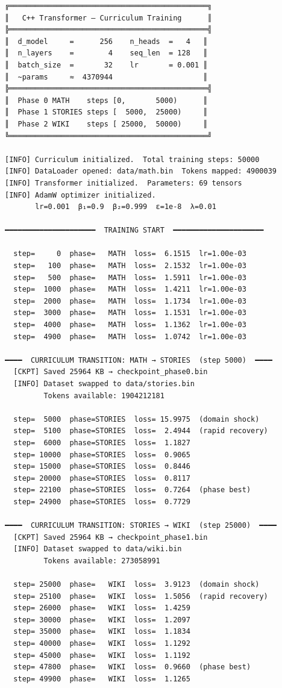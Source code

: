 \documentclass[12pt, a4paper]{article}
\begin{document}
\begin{verbatim}
╔══════════════════════════════════════════════╗
║   C++ Transformer — Curriculum Training      ║
╠══════════════════════════════════════════════╣
║  d_model     =      256    n_heads  =   4   ║
║  n_layers    =        4    seq_len  = 128   ║
║  batch_size  =       32    lr       = 0.001 ║
║  ~params     ≈  4370944                     ║
╠══════════════════════════════════════════════╣
║  Phase 0 MATH    steps [0,       5000)      ║
║  Phase 1 STORIES steps [  5000,  25000)     ║
║  Phase 2 WIKI    steps [ 25000,  50000)     ║
╚══════════════════════════════════════════════╝

[INFO] Curriculum initialized.  Total training steps: 50000
[INFO] DataLoader opened: data/math.bin  Tokens mapped: 4900039
[INFO] Transformer initialized.  Parameters: 69 tensors
[INFO] AdamW optimizer initialized.
       lr=0.001  β₁=0.9  β₂=0.999  ε=1e-8  λ=0.01

━━━━━━━━━━━━━━━━━━━━━  TRAINING START  ━━━━━━━━━━━━━━━━━━━━━

  step=     0  phase=   MATH  loss=  6.1515  lr=1.00e-03
  step=   100  phase=   MATH  loss=  2.1532  lr=1.00e-03
  step=   500  phase=   MATH  loss=  1.5911  lr=1.00e-03
  step=  1000  phase=   MATH  loss=  1.4211  lr=1.00e-03
  step=  2000  phase=   MATH  loss=  1.1734  lr=1.00e-03
  step=  3000  phase=   MATH  loss=  1.1531  lr=1.00e-03
  step=  4000  phase=   MATH  loss=  1.1362  lr=1.00e-03
  step=  4900  phase=   MATH  loss=  1.0742  lr=1.00e-03

━━━━  CURRICULUM TRANSITION: MATH → STORIES  (step 5000)  ━━━━
  [CKPT] Saved 25964 KB → checkpoint_phase0.bin
  [INFO] Dataset swapped to data/stories.bin
         Tokens available: 1904212181

  step=  5000  phase=STORIES  loss= 15.9975  (domain shock)
  step=  5100  phase=STORIES  loss=  2.4944  (rapid recovery)
  step=  6000  phase=STORIES  loss=  1.1827
  step= 10000  phase=STORIES  loss=  0.9065
  step= 15000  phase=STORIES  loss=  0.8446
  step= 20000  phase=STORIES  loss=  0.8117
  step= 22100  phase=STORIES  loss=  0.7264  (phase best)
  step= 24900  phase=STORIES  loss=  0.7729

━━━━  CURRICULUM TRANSITION: STORIES → WIKI  (step 25000)  ━━━━
  [CKPT] Saved 25964 KB → checkpoint_phase1.bin
  [INFO] Dataset swapped to data/wiki.bin
         Tokens available: 273058991

  step= 25000  phase=   WIKI  loss=  3.9123  (domain shock)
  step= 25100  phase=   WIKI  loss=  1.5056  (rapid recovery)
  step= 26000  phase=   WIKI  loss=  1.4259
  step= 30000  phase=   WIKI  loss=  1.2097
  step= 35000  phase=   WIKI  loss=  1.1834
  step= 40000  phase=   WIKI  loss=  1.1292
  step= 45000  phase=   WIKI  loss=  1.1192
  step= 47800  phase=   WIKI  loss=  0.9660  (phase best)
  step= 49900  phase=   WIKI  loss=  1.1265


\end{verbatim}
\end{document}
